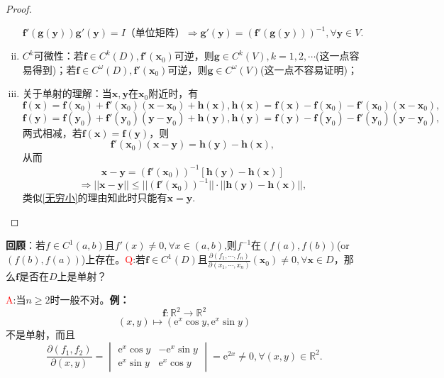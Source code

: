 \documentclass[UTF8]{ctexart}
\newcommand{\e}{\mathrm{e}}
\newcommand{\p}[2]{\frac{\partial #1}{\partial #2}}
\begin{document}
\begin{proof}
\begin{enumerate}[(i)]
            $$\boldsymbol{f}'(\boldsymbol{g}(\boldsymbol{y}))\boldsymbol{g}'(\boldsymbol{y})=I\text{（单位矩阵）}\Rightarrow \boldsymbol{g}'(\boldsymbol{y})=(\boldsymbol{f}'(\boldsymbol{g}(\boldsymbol{y})))^{-1},\forall\boldsymbol{y}\in V.$$
            \item $C^k$可微性：若$\boldsymbol{f}\in C^k(D),\boldsymbol{f}'(\boldsymbol{x}_0)$可逆，则$\boldsymbol{g}\in C^k(V),k=1,2,\cdots$(这一点容易得到)；若$\boldsymbol{f}\in C^\omega(D),\boldsymbol{f}'(\boldsymbol{x}_0)$可逆，则$\boldsymbol{g}\in C^\omega(V)$(这一点不容易证明)；
            \item 关于单射的理解：当$\boldsymbol{x},\boldsymbol{y}$在$\boldsymbol{x}_0$附近时，有$$\boldsymbol{f}(\boldsymbol{x})=\boldsymbol{f}(\boldsymbol{x}_0)+\boldsymbol{f}'(\boldsymbol{x}_0)(\boldsymbol{x}-\boldsymbol{x}_0)+\boldsymbol{h}(\boldsymbol{x}),\boldsymbol{h}(\boldsymbol{x})=\boldsymbol{f}(\boldsymbol{x})-\boldsymbol{f}(\boldsymbol{x}_0)-\boldsymbol{f}'(\boldsymbol{x}_0)(\boldsymbol{x}-\boldsymbol{x}_0),$$
            $$\boldsymbol{f}(\boldsymbol{y})=\boldsymbol{f}(\boldsymbol{y}_0)+\boldsymbol{f}'(\boldsymbol{y}_0)(\boldsymbol{y}-\boldsymbol{y}_0)+\boldsymbol{h}(\boldsymbol{y}),\boldsymbol{h}(\boldsymbol{y})=\boldsymbol{f}(\boldsymbol{y})-\boldsymbol{f}(\boldsymbol{y}_0)-\boldsymbol{f}'(\boldsymbol{y}_0)(\boldsymbol{y}-\boldsymbol{y}_0),$$
            两式相减，若$\boldsymbol{f}(\boldsymbol{x})=\boldsymbol{f}(\boldsymbol{y})$，则$$\boldsymbol{f}'(\boldsymbol{x}_0)(\boldsymbol{x}-\boldsymbol{y})=\boldsymbol{h}(\boldsymbol{y})-\boldsymbol{h}(\boldsymbol{x}),$$从而$$\boldsymbol{x}-\boldsymbol{y}=(\boldsymbol{f}'(\boldsymbol{x}_0))^{-1}[\boldsymbol{h}(\boldsymbol{y})-\boldsymbol{h}(\boldsymbol{x})]$$
            $$\Rightarrow||\boldsymbol{x}-\boldsymbol{y}||\le ||(\boldsymbol{f}'(\boldsymbol{x}_0))^{-1}||\cdot||\boldsymbol{h}(\boldsymbol{y})-\boldsymbol{h}(\boldsymbol{x})||,$$类似\ref{无穷小}的理由知此时只能有$\boldsymbol{x}=\boldsymbol{y}$.
        \end{enumerate}
    \end{proof}

    \textbf{回顾}：若$f\in C^1(a,b)$且$f'(x)\not=0,\forall x\in (a,b)$,则$f^{-1}$在$(f(a),f(b))$(or $(f(b),f(a))$)上存在。\textcolor{red}{Q}:若$\boldsymbol{f}\in C^1(D)$且$\p{(f_1,\cdots,f_n)}{(x_1,\cdots,x_n)}(\boldsymbol{x}_0)\not=0,\forall\boldsymbol{x}\in D$，那么$\boldsymbol{f}$是否在$D$上是单射？

    \textcolor{red}{A}:当$n\ge 2$时一般不对。\textbf{例：}
    $$\boldsymbol{f}:\mathbb{R}^2\rightarrow \mathbb{R}^2$$
    $$(x,y)\mapsto(\e^x\cos y,\e^x\sin y)$$%
    不是单射，而且$$\p{(f_1,f_2)}{(x,y)}=\begin{vmatrix}
        \e^x\cos y&-\e^x\sin y\\
        \e^x\sin y&\e^x\cos y
    \end{vmatrix}=\e^{2x}\not=0,\forall(x,y)\in\mathbb{R}^2.$$
\end{document}
